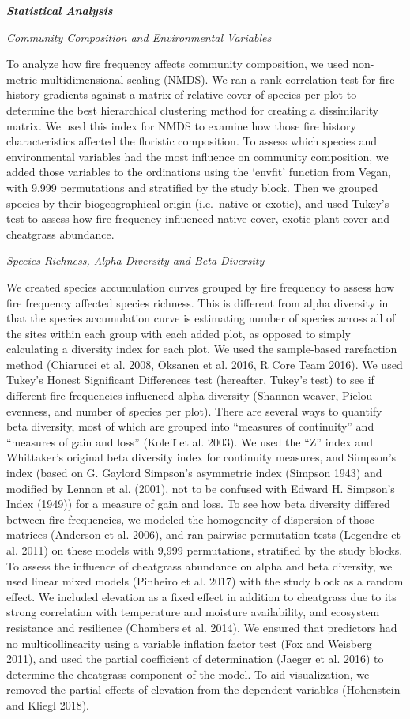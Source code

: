 \documentclass[12pt,]{article}
\begin{document}
\textbf{\emph{Statistical Analysis}}

\emph{Community Composition and Environmental Variables}

To analyze how fire frequency affects community composition, we used
non-metric multidimensional scaling (NMDS). We ran a rank correlation
test for fire history gradients against a matrix of relative cover of
species per plot to determine the best hierarchical clustering method
for creating a dissimilarity matrix. We used this index for NMDS to
examine how those fire history characteristics affected the floristic
composition. To assess which species and environmental variables had the
most influence on community composition, we added those variables to the
ordinations using the `envfit' function from Vegan, with 9,999
permutations and stratified by the study block. Then we grouped species
by their biogeographical origin (i.e.~native or exotic), and used
Tukey's test to assess how fire frequency influenced native cover,
exotic plant cover and cheatgrass abundance.

\emph{Species Richness, Alpha Diversity and Beta Diversity}

We created species accumulation curves grouped by fire frequency to
assess how fire frequency affected species richness. This is different
from alpha diversity in that the species accumulation curve is
estimating number of species across all of the sites within each group
with each added plot, as opposed to simply calculating a diversity index
for each plot. We used the sample-based rarefaction method (Chiarucci et
al. 2008, Oksanen et al. 2016, R Core Team 2016). We used Tukey's Honest
Significant Differences test (hereafter, Tukey's test) to see if
different fire frequencies influenced alpha diversity (Shannon-weaver,
Pielou evenness, and number of species per plot). There are several ways
to quantify beta diversity, most of which are grouped into ``measures of
continuity'' and ``measures of gain and loss'' (Koleff et al. 2003). We
used the ``Z'' index and Whittaker's original beta diversity index for
continuity measures, and Simpson's index (based on G. Gaylord Simpson's
asymmetric index (Simpson 1943) and modified by Lennon et al. (2001),
not to be confused with Edward H. Simpson's Index (1949)) for a measure
of gain and loss. To see how beta diversity differed between fire
frequencies, we modeled the homogeneity of dispersion of those matrices
(Anderson et al. 2006), and ran pairwise permutation tests (Legendre et
al. 2011) on these models with 9,999 permutations, stratified by the
study blocks. To assess the influence of cheatgrass abundance on alpha
and beta diversity, we used linear mixed models (Pinheiro et al. 2017)
with the study block as a random effect. We included elevation as a
fixed effect in addition to cheatgrass due to its strong correlation
with temperature and moisture availability, and ecosystem resistance and
resilience (Chambers et al. 2014). We ensured that predictors had no
multicollinearity using a variable inflation factor test (Fox and
Weisberg 2011), and used the partial coefficient of determination
(Jaeger et al. 2016) to determine the cheatgrass component of the model.
To aid visualization, we removed the partial effects of elevation from
the dependent variables (Hohenstein and Kliegl 2018).
\end{document}
